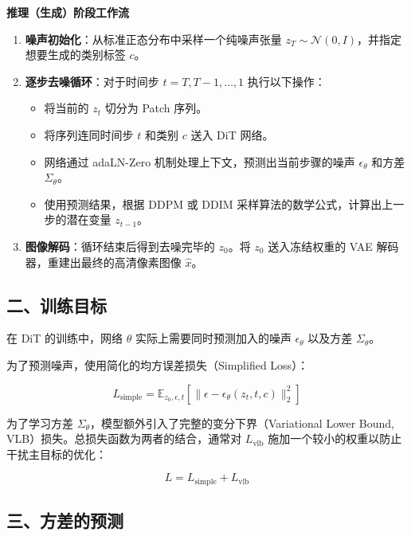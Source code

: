 \textbf{推理（生成）阶段工作流}

\begin{enumerate}
\def\labelenumi{\arabic{enumi}.}
\tightlist
\item
  \textbf{噪声初始化}：从标准正态分布中采样一个纯噪声张量 \(z_T\sim\mathcal{N}(0,I)\)，并指定想要生成的类别标签 \(c\)。
\item
  \textbf{逐步去噪循环}：对于时间步 \(t=T,T-1,\ldots,1\) 执行以下操作：

  \begin{itemize}
  \tightlist
  \item
    将当前的 \(z_t\) 切分为 Patch 序列。
  \item
    将序列连同时间步 \(t\) 和类别 \(c\) 送入 DiT 网络。
  \item
    网络通过 adaLN-Zero 机制处理上下文，预测出当前步骤的噪声 \(\epsilon_\theta\) 和方差 \(\Sigma_\theta\)。
  \item
    使用预测结果，根据 DDPM 或 DDIM 采样算法的数学公式，计算出上一步的潜在变量 \(z_{t-1}\)。
  \end{itemize}
\item
  \textbf{图像解码}：循环结束后得到去噪完毕的 \(z_0\)。将 \(z_0\) 送入冻结权重的 VAE 解码器，重建出最终的高清像素图像 \(\hat{x}\)。
\end{enumerate}

\hypertarget{ux4e8cux8badux7ec3ux76eeux6807}{%
\subsection{二、训练目标}\label{ux4e8cux8badux7ec3ux76eeux6807}}

在 DiT 的训练中，网络 \(\theta\) 实际上需要同时预测加入的噪声 \(\epsilon_\theta\) 以及方差 \(\Sigma_\theta\)。

为了预测噪声，使用简化的均方误差损失（Simplified Loss）：

\[
L_{\mathrm{simple}}=\mathbb{E}_{z_0,\epsilon,t}\left[\lVert \epsilon-\epsilon_\theta(z_t,t,c)\rVert_2^2\right]
\]

为了学习方差 \(\Sigma_\theta\)，模型额外引入了完整的变分下界（Variational Lower Bound, VLB）损失。总损失函数为两者的结合，通常对 \(L_{\mathrm{vlb}}\) 施加一个较小的权重以防止干扰主目标的优化：

\[
L=L_{\mathrm{simple}}+L_{\mathrm{vlb}}
\]

\hypertarget{ux4e09ux65b9ux5deeux7684ux9884ux6d4b}{%
\subsection{三、方差的预测}\label{ux4e09ux65b9ux5deeux7684ux9884ux6d4b}}

